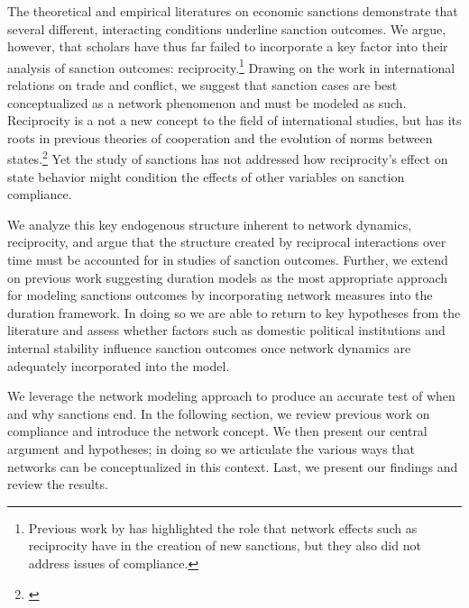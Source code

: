 The theoretical and empirical literatures on economic sanctions demonstrate that several different, interacting conditions underline sanction outcomes. We argue, however, that scholars have thus far failed to incorporate a key factor into their analysis of sanction outcomes: reciprocity.\footnote{Previous work by \cite{cranmer2014reciprocity} has highlighted the role that network effects such as reciprocity have in the creation of new sanctions, but they also did not address issues of compliance.} Drawing on the work in international relations on trade and conflict, we suggest that sanction cases are best conceptualized as a network phenomenon and must be modeled as such. Reciprocity is a not a new concept to the field of international studies, but has its roots in previous theories of cooperation and the evolution of norms between states.\footnote{\cite{richardsonai:1960,choucri:north:1972,goldstein1991reciprocity,rajmaira1990evolving,ward1992reciprocity}} Yet the study of sanctions has not addressed how reciprocity's effect on state behavior might condition the effects of other variables on sanction compliance. 

We analyze this key endogenous structure inherent to network dynamics, reciprocity, and argue that the structure created by reciprocal interactions over time must be accounted for in studies of sanction outcomes. Further, we extend on previous work suggesting duration models as the most appropriate approach for modeling sanctions outcomes by incorporating network measures into the duration framework. In doing so we are able to return to key hypotheses from the literature and assess whether factors such as domestic political institutions and internal stability influence sanction outcomes once network dynamics are adequately incorporated into the model. 

We leverage the network modeling approach to produce an accurate test of when and why sanctions end. In the following section, we review previous work on compliance and introduce the network concept. We then present our central argument and hypotheses; in doing so we articulate the various ways that networks can be conceptualized in this context. Last, we present our findings and review the results.